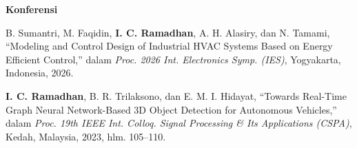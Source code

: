 \vspace{4pt}
\noindent\textbf{Konferensi}
\begin{enumerate}[label={[C\arabic*]}, leftmargin=2.8em]
  \item B. Sumantri, M. Faqidin, \textbf{I. C. Ramadhan}, A. H. Alasiry, dan N. Tamami,
        ``Modeling and Control Design of Industrial HVAC Systems Based on Energy
        Efficient Control,'' dalam \textit{Proc. 2026 Int. Electronics Symp. (IES)},
        Yogyakarta, Indonesia, 2026.

  \item \textbf{I. C. Ramadhan}, B. R. Trilaksono, dan E. M. I. Hidayat,
        ``Towards Real-Time Graph Neural Network-Based 3D Object Detection
        for Autonomous Vehicles,''
        dalam \textit{Proc. 19th IEEE Int. Colloq. Signal Processing \& Its
        Applications (CSPA)}, Kedah, Malaysia, 2023, hlm. 105--110.
\end{enumerate}

